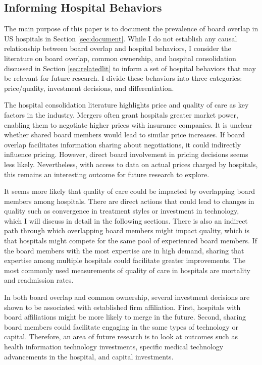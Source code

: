 \documentclass[12pt]{article}
\begin{document}
    

    \subsection{Informing Hospital Behaviors}\label{sec:hospbehaviors}

    The main purpose of this paper is to document the prevalence of board overlap in US hospitals in Section \ref{sec:document}. While I do not establish any causal relationship between board overlap and hospital behaviors, I consider the literature on board overlap, common ownership, and hospital consolidation discussed in Section \ref{sec:relatedlit} to inform a set of hospital behaviors that may be relevant for future research. I divide these behaviors into three categories: price/quality, investment decisions, and differentiation. 

    The hospital consolidation literature highlights price and quality of care as key factors in the industry. Mergers often grant hospitals greater market power, enabling them to negotiate higher prices with insurance companies. It is unclear whether shared board members would lead to similar price increases. If board overlap facilitates information sharing about negotiations, it could indirectly influence pricing. However, direct board involvement in pricing decisions seems less likely. Nevertheless, with access to data on actual prices charged by hospitals, this remains an interesting outcome for future research to explore.

    It seems more likely that quality of care could be impacted by overlapping board members among hospitals. There are direct actions that could lead to changes in quality such as convergence in treatment styles or investment in technology, which I will discuss in detail in the following sections. There is also an indirect path through which overlapping board members might impact quality, which is that hospitals might compete for the same pool of experienced board members. If the board members with the most expertise are in high demand, sharing that expertise among multiple hospitals could facilitate greater improvements. The most commonly used measurements of quality of care in hospitals are mortality and readmission rates. 

    In both board overlap and common ownership, several investment decisions are shown to be associated with established firm affiliation. First, hospitals with board affiliations might be more likely to merge in the future. Second, sharing board members could facilitate engaging in the same types of technology or capital. Therefore, an area of future research is to look at outcomes such as health information technology investments, specific medical technology advancements in the hospital, and capital investments. 
\end{document}
